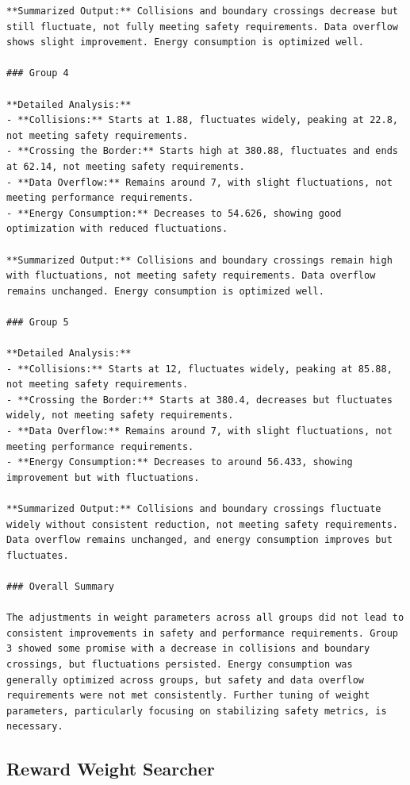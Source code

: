 \documentclass{article}
\begin{document}
\begin{verbatim}
**Summarized Output:** Collisions and boundary crossings decrease but still fluctuate, not fully meeting safety requirements. Data overflow shows slight improvement. Energy consumption is optimized well.

### Group 4

**Detailed Analysis:**
- **Collisions:** Starts at 1.88, fluctuates widely, peaking at 22.8, not meeting safety requirements.
- **Crossing the Border:** Starts high at 380.88, fluctuates and ends at 62.14, not meeting safety requirements.
- **Data Overflow:** Remains around 7, with slight fluctuations, not meeting performance requirements.
- **Energy Consumption:** Decreases to 54.626, showing good optimization with reduced fluctuations.

**Summarized Output:** Collisions and boundary crossings remain high with fluctuations, not meeting safety requirements. Data overflow remains unchanged. Energy consumption is optimized well.

### Group 5

**Detailed Analysis:**
- **Collisions:** Starts at 12, fluctuates widely, peaking at 85.88, not meeting safety requirements.
- **Crossing the Border:** Starts at 380.4, decreases but fluctuates widely, not meeting safety requirements.
- **Data Overflow:** Remains around 7, with slight fluctuations, not meeting performance requirements.
- **Energy Consumption:** Decreases to around 56.433, showing improvement but with fluctuations.

**Summarized Output:** Collisions and boundary crossings fluctuate widely without consistent reduction, not meeting safety requirements. Data overflow remains unchanged, and energy consumption improves but fluctuates.

### Overall Summary

The adjustments in weight parameters across all groups did not lead to consistent improvements in safety and performance requirements. Group 3 showed some promise with a decrease in collisions and boundary crossings, but fluctuations persisted. Energy consumption was generally optimized across groups, but safety and data overflow requirements were not met consistently. Further tuning of weight parameters, particularly focusing on stabilizing safety metrics, is necessary.

\end{verbatim}


\subsection{Reward Weight Searcher} 
\end{document}
